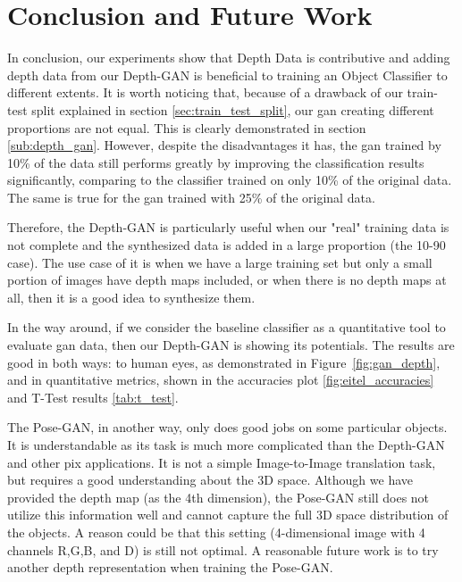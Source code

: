 
\chapter{Conclusion and Future Work \label{cha:conclusion}}

In conclusion, our experiments show that Depth Data is contributive and adding depth data
from our Depth-GAN is beneficial to training an Object Classifier to different extents. 
It is worth noticing that, because of a drawback of our train-test split explained in
section \ref{sec:train_test_split}, our \acrshort{gan} creating different proportions
are not equal. This is clearly demonstrated in section \ref{sub:depth_gan}. However,
despite the disadvantages it has, the \acrshort{gan} trained by 10\% of the data still
performs greatly by improving the classification results significantly, comparing to the
classifier trained on only 10\% of the original data. The same is true for the
\acrshort{gan} trained with 25\% of the original data.

Therefore, the Depth-GAN is particularly useful when our "real" training data is not
complete and the synthesized data is added in a large proportion (the 10-90 case). The use
case of it is when we have a large training set but only a small portion of images have
depth maps included, or when there is no depth maps at all, then it is a good idea to
synthesize them.

In the way around, if we consider the baseline classifier as a quantitative tool to
evaluate \acrshort{gan} data, then our Depth-GAN is showing its potentials. The results
are good in both ways: to human eyes, as demonstrated in Figure~\ref{fig:gan_depth}, and
in quantitative metrics, shown in the accuracies plot \ref{fig:eitel_accuracies} and
T-Test results \ref{tab:t_test}.

The Pose-GAN, in another way, only does good jobs on some particular objects. It is
understandable as its task is much more complicated than the Depth-GAN and other
\acrshort{pix} applications. It is not a simple Image-to-Image translation task, but
requires a good understanding about the 3D space. Although we have provided the depth map
(as the 4th dimension), the Pose-GAN still does not utilize this information well and
cannot capture the full 3D space distribution of the objects. A reason could be that this
setting (4-dimensional image with 4 channels R,G,B, and D) is still not optimal. A
reasonable future work is to try another depth representation when training the Pose-GAN.

